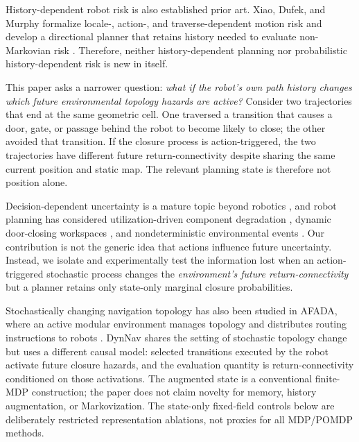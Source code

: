 \documentclass[conference]{IEEEtran}
\begin{document}
History-dependent robot risk is also established prior art. Xiao, Dufek, and Murphy formalize locale-, action-, and traverse-dependent motion risk and develop a directional planner that retains history needed to evaluate non-Markovian risk \cite{xiao2020risk}. Therefore, neither history-dependent planning nor probabilistic history-dependent risk is new in itself.

This paper asks a narrower question: \emph{what if the robot's own path history changes which future environmental topology hazards are active?} Consider two trajectories that end at the same geometric cell. One traversed a transition that causes a door, gate, or passage behind the robot to become likely to close; the other avoided that transition. If the closure process is action-triggered, the two trajectories have different future return-connectivity despite sharing the same current position and static map. The relevant planning state is therefore not position alone.

Decision-dependent uncertainty is a mature topic beyond robotics \cite{doan2022endogenous}, and robot planning has considered utilization-driven component degradation \cite{baldes2024fallible}, dynamic door-closing workspaces \cite{liu2021door}, and nondeterministic environmental events \cite{perret1996events}. Our contribution is not the generic idea that actions influence future uncertainty. Instead, we isolate and experimentally test the information lost when an action-triggered stochastic process changes the \emph{environment's future return-connectivity} but a planner retains only state-only marginal closure probabilities.

Stochastically changing navigation topology has also been studied in AFADA, where an active modular environment manages topology and distributes routing instructions to robots \cite{kameyama2021active}. DynNav shares the setting of stochastic topology change but uses a different causal model: selected transitions executed by the robot activate future closure hazards, and the evaluation quantity is return-connectivity conditioned on those activations. The augmented state is a conventional finite-MDP construction; the paper does not claim novelty for memory, history augmentation, or Markovization. The state-only fixed-field controls below are deliberately restricted representation ablations, not proxies for all MDP/POMDP methods.
\end{document}
